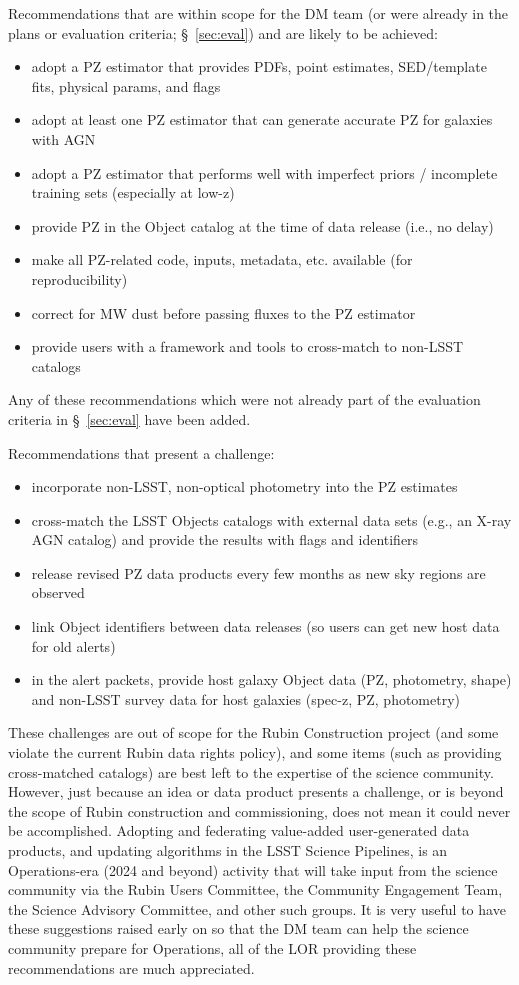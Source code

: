 \documentclass[DM,authoryear,toc]{lsstdoc}
\begin{document}
Recommendations that are within scope for the DM team (or were already in the plans or evaluation criteria; \S~\ref{sec:eval}) and are likely to be achieved:
\begin{itemize}
\item adopt a PZ estimator that provides PDFs, point estimates, SED/template fits, physical params, and flags
\item adopt at least one PZ estimator that can generate accurate PZ for galaxies with AGN
\item adopt a PZ estimator that performs well with imperfect priors / incomplete training sets (especially at low-z) 
\item provide PZ in the Object catalog at the time of data release (i.e., no delay)
\item make all PZ-related code, inputs, metadata, etc. available (for reproducibility)
\item correct for MW dust before passing fluxes to the PZ estimator
\item provide users with a framework and tools to cross-match to non-LSST catalogs
\end{itemize}
Any of these recommendations which were not already part of the evaluation criteria in \S~\ref{sec:eval} have been added.

Recommendations that present a challenge:
\begin{itemize}
\item incorporate non-LSST, non-optical photometry into the PZ estimates
\item cross-match the LSST Objects catalogs with external data sets (e.g., an X-ray AGN catalog) and provide the results with flags and identifiers
\item release revised PZ data products every few months as new sky regions are observed
\item link Object identifiers between data releases (so users can get new host data for old alerts)
\item in the alert packets, provide host galaxy Object data (PZ, photometry, shape) and non-LSST survey data for host galaxies (spec-z, PZ, photometry)
\end{itemize}
These challenges are out of scope for the Rubin Construction project (and some violate the current Rubin data rights policy), and some items (such as providing cross-matched catalogs) are best left to the expertise of the science community.
However, just because an idea or data product presents a challenge, or is beyond the scope of Rubin construction and commissioning, does not mean it could never be accomplished.
Adopting and federating value-added user-generated data products, and updating algorithms in the LSST Science Pipelines, is an Operations-era (2024 and beyond) activity that will take input from the science community via the Rubin Users Committee, the Community Engagement Team, the Science Advisory Committee, and other such groups.
It is very useful to have these suggestions raised early on so that the DM team can help the science community prepare for Operations, all of the LOR providing these recommendations are much appreciated.
\end{document}

